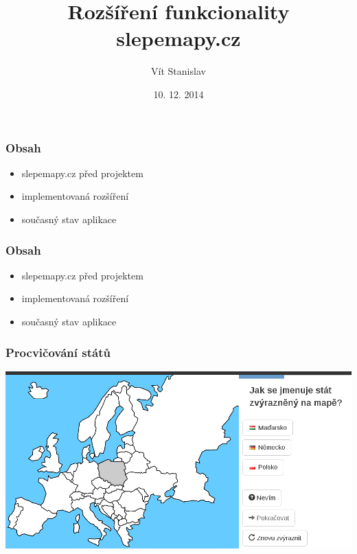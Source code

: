 \documentclass[xcolor=svgnames]{beamer}
\title[slepemapy.cz]{Rozšíření funkcionality slepemapy.cz}
\author{Vít Stanislav}
\institute{Fakulta informatiky Masarykovy univerzity}      %
\date{10. 12. 2014}
\newcommand{\semitransp}[2][35]{\color{fg!#1}#2}
\begin{document}
\frame[plain]{\titlepage}
\begin{frame}
	\frametitle{Obsah}
  \begin{itemize}
  \huge \item slepemapy.cz před projektem
  \huge \item implementovaná rozšíření
  \huge \item současný stav aplikace
  \end{itemize}
\end{frame}
\begin{frame}
	\frametitle{Obsah}
  \begin{itemize}
  \huge \item slepemapy.cz před projektem
  \semitransp[20]{ \huge \item implementovaná rozšíření
  \huge \item současný stav aplikace}
  \end{itemize}
\end{frame}
\begin{frame}
	\frametitle{Procvičování států}
   \includegraphics[width=\textwidth]{img/practice-example-cs.png}
\end{frame}
\end{document}
